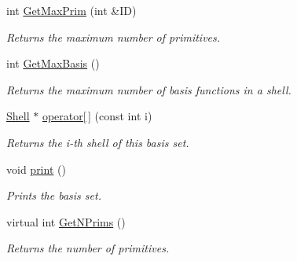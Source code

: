 \begin{DoxyCompactItemize}
int \hyperlink{classJKBuilder_1_1AtomicBasisSet_a03191bf41d6e3a2445dd3eb8640305be}{GetMaxPrim} (int \&ID)
\begin{DoxyCompactList}\small\item\em Returns the maximum number of primitives. \item\end{DoxyCompactList}\item 
int \hyperlink{classJKBuilder_1_1AtomicBasisSet_adcda37af511d6b4f8d305fcba2da5c4a}{GetMaxBasis} ()
\begin{DoxyCompactList}\small\item\em Returns the maximum number of basis functions in a shell. \item\end{DoxyCompactList}\item 
\hyperlink{classJKBuilder_1_1Shell}{Shell} $\ast$ \hyperlink{classJKBuilder_1_1AtomicBasisSet_a6da2f2341be7b61c7221afb16fdd72db}{operator\mbox{[}$\,$\mbox{]}} (const int i)
\begin{DoxyCompactList}\small\item\em Returns the i-\/th shell of this basis set. \item\end{DoxyCompactList}\item 
void \hyperlink{classJKBuilder_1_1AtomicBasisSet_a388f572c62279f839ee138a9afbdeeb5}{print} ()
\begin{DoxyCompactList}\small\item\em Prints the basis set. \item\end{DoxyCompactList}\item 
virtual int \hyperlink{classJKBuilder_1_1BasisSet_abc886cd4e35d3c56a0250b7d06986f61}{GetNPrims} ()
\begin{DoxyCompactList}\small\item\em Returns the number of primitives. \item\end{DoxyCompactList}\end{DoxyCompactItemize}
